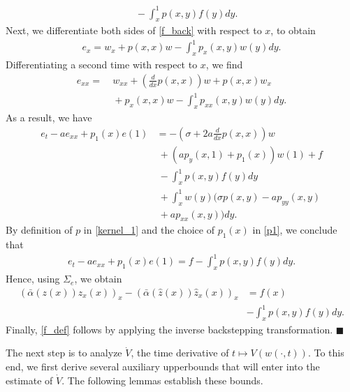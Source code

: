 \documentclass[twocolumn]{autart}
\newenvironment{proof}{{\it Proof. }}{\hfill $\blacksquare$ }
\begin{document}
\begin{proof}
\begin{align*}
&~-\int_{x}^1p(x,y)f(y)dy. 
\end{align*}
Next, we differentiate both sides of \eqref{f_back} with respect to $x$, to obtain 
\begin{align*}
e_x = w_x+p(x,x)w-\int_{x}^{1}p_x(x,y)w(y)dy.
\end{align*}
Differentiating a second time with respect to $x$, we find 
\begin{align*}
e_{xx} =&~w_{xx}+\left( \frac{d}{dx}p(x,x)\right)w+p(x,x)w_x \\
&~+p_x(x,x)w-\int_{x}^{1}p_{xx}(x,y)w(y)dy. 
\end{align*}
As a result, we have 
\begin{align*}
e_t-ae_{xx} +p_1(x)e(1)&= -\left(\sigma+2a\frac{d}{dx}p(x,x)\right)w\nonumber \\
&~+\left(ap_y(x,1)+p_1(x)\right)w(1) +f \nonumber \\
&~-\int_{x}^{1}p(x,y)f(y)dy \nonumber \\
&~+\int_x^1w(y)\big(\sigma p(x,y)-ap_{yy}(x,y) \nonumber \\
&~+ap_{xx}(x,y)\big)dy.
\end{align*}
By definition of $p$ in \eqref{kernel_1} and the choice of $p_1(x)$ in \eqref{p1}, we conclude that 
\begin{align*}
e_t-ae_{xx} +p_1(x)e(1) = f -\int_{x}^1p(x,y)f(y)dy. 
\end{align*}
Hence, using $\Sigma_e$, we obtain 
\begin{align*}
(\bar{\alpha}(z(x))z_x(x))_x-(\bar{\alpha}(\hat{z}(x))\hat{z}_x(x))_x &= f(x) \\
&-\int_{x}^{1}p(x,y)f(y)dy.
\end{align*}
Finally, \eqref{f_def} follows by applying the inverse backstepping transformation.
\end{proof}

The next step is to analyze $\dot{V}$, the time derivative of $t\mapsto V(w(\cdot,t))$. To this end, we first derive several auxiliary upperbounds that will enter into the estimate of $\dot{V}$. The following lemmas establish these bounds.
\end{document}
